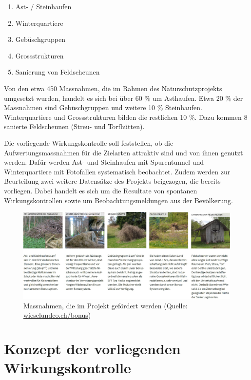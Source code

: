 \documentclass[
  oneside]{scrbook}
\providecommand{\tightlist}{%
  \setlength{\itemsep}{0pt}\setlength{\parskip}{0pt}}
\begin{document}
\begin{enumerate}
\def\labelenumi{\arabic{enumi}.}
\tightlist
\item
  Ast- / Steinhaufen
\item
  Winterquartiere
\item
  Gebüschgruppen
\item
  Grossstrukturen
\item
  Sanierung von Feldscheunen
\end{enumerate}

Von den etwa 450 Massnahmen, die im Rahmen des Naturschutzprojekts umgesetzt wurden, handelt es sich bei über 60 \% um Asthaufen. Etwa 20 \% der Massnahmen sind Gebüschgruppen und weitere 10 \% Steinhaufen. Winterquartiere und Grossstrukturen bilden die restlichen 10 \%. Dazu kommen 8 sanierte Feldscheunen (Streu- und Torfhütten).

Die vorliegende Wirkungskontrolle soll feststellen, ob die Aufwertungsmassnahmen für die Zielarten attraktiv sind und von ihnen genutzt werden. Dafür werden Ast- und Steinhaufen mit Spurentunnel und Winterquartiere mit Fotofallen systematisch beobachtet. Zudem werden zur Beurteilung zwei weitere Datensätze des Projekts beigezogen, die bereits vorliegen. Dabei handelt es sich um die Resultate von spontanen Wirkungskontrollen sowie um Beobachtungsmeldungen aus der Bevölkerung.



\begin{figure}[H]
\includegraphics[width=1\linewidth]{images/massnahmen} \caption{Massnahmen, die im Projekt gefördert werden (Quelle: \href{http://www.wieselundco.ch/bonus}{wieselundco.ch/bonus})}\label{fig:massnahmen}
\end{figure}

\hypertarget{konzept-der-vorliegenden-wirkungskontrolle}{%
\chapter{Konzept der vorliegenden Wirkungskontrolle}\label{konzept-der-vorliegenden-wirkungskontrolle}}
\end{document}

